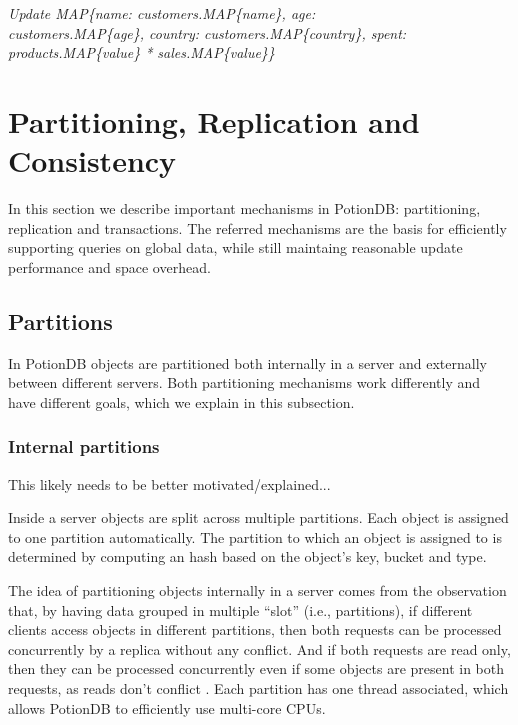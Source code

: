 \documentclass{vldb}
\newcommand{\grumbler}[2]{{\color{red}{\bf #1:} #2}}
\newcommand{\andre}[1]{\grumbler{andre}{#1}}
\newcommand{\emphvspace}{0.5\baselineskip}
\newcommand{\lastblockemph}[1]{\hspace{2em}\emph{#1}\vspace{\emphvspace}}
\begin{document}
\lastblockemph{Update MAP\{name: customers.MAP\{name\}, age: \\ customers.MAP\{age\}, country: customers.MAP\{country\}, spent: products.MAP\{value\} * sales.MAP\{value\}\}}

\section{Partitioning, Replication and Consistency}

In this section we describe important mechanisms in PotionDB: partitioning, replication and transactions.
The referred mechanisms are the basis for efficiently supporting queries on global data, while still maintaing reasonable update performance and space overhead.

\subsection{Partitions}

In PotionDB objects are partitioned both internally in a server and externally between different servers.
Both partitioning mechanisms work differently and have different goals, which we explain in this subsection.

\subsubsection{Internal partitions}

\andre{This likely needs to be better motivated/explained...}

Inside a server objects are split across multiple partitions.
Each object is assigned to one partition automatically.
The partition to which an object is assigned to is determined by computing an hash based on the object's key, bucket and type.

The idea of partitioning objects internally in a server comes from the observation that, by having data grouped in multiple ``slot'' (i.e., partitions), if different clients access objects in different partitions, then both requests can be processed concurrently by a replica without any conflict.
And if both requests are read only, then they can be processed concurrently even if some objects are present in both requests, as reads don't conflict \cite{???}.
Each partition has one thread associated, which allows PotionDB to efficiently use multi-core CPUs.
\end{document}
